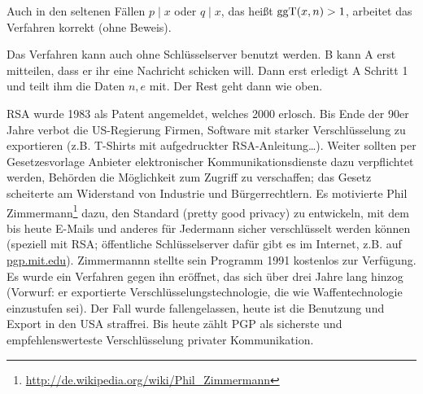 \begin{bem}
	Auch in den seltenen Fällen $p \mid x$ oder $q \mid x$, das heißt $\operatorname{ggT}(x,n) > 1$, arbeitet das Verfahren korrekt (ohne Beweis).
\end{bem}

\begin{bem}
	Das Verfahren kann auch ohne Schlüsselserver benutzt werden. B kann A erst mitteilen, dass er ihr eine Nachricht schicken will. Dann erst erledigt A Schritt 1 und teilt ihm die Daten $n,e$ mit. Der Rest geht dann wie oben.
\end{bem}

\begin{bem}
	RSA wurde 1983 als Patent angemeldet, welches 2000 erlosch. Bis Ende der 90er Jahre verbot die US-Regierung Firmen, Software mit starker Verschlüsselung zu exportieren (z.B. T-Shirts mit aufgedruckter RSA-Anleitung\dots). Weiter sollten per Gesetzesvorlage Anbieter elektronischer Kommunikationsdienste dazu verpflichtet werden, Behörden die Möglichkeit zum Zugriff zu verschaffen; das Gesetz scheiterte am Widerstand von Industrie und Bürgerrechtlern. Es motivierte Phil Zimmermann\footnote{\url{http://de.wikipedia.org/wiki/Phil_Zimmermann}} dazu, den Standard  (pretty good privacy) zu entwickeln, mit dem bis heute E-Mails und anderes für Jedermann sicher verschlüsselt werden können (speziell mit RSA; öffentliche Schlüsselserver dafür gibt es im Internet, z.B. auf \href{http://pgp.mit.edu}{pgp.mit.edu}). Zimmermannn stellte sein Programm 1991 kostenlos zur Verfügung. Es wurde ein Verfahren gegen ihn eröffnet, das sich über drei Jahre lang hinzog (Vorwurf: er exportierte Verschlüsselungstechnologie, die wie Waffentechnologie einzustufen sei). Der Fall wurde fallengelassen, heute ist die Benutzung und Export in den USA straffrei. Bis heute zählt PGP als sicherste und empfehlenswerteste Verschlüsselung privater Kommunikation.
\end{bem}


